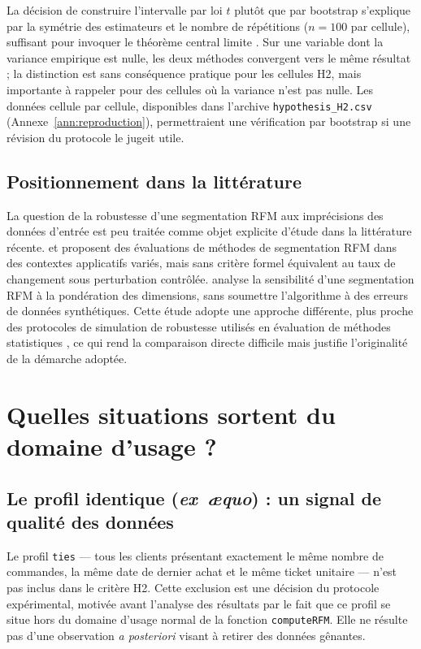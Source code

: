 La décision de construire l'intervalle par loi $t$ plutôt que par bootstrap s'explique par
la symétrie des estimateurs et le nombre de répétitions ($n = 100$ par cellule), suffisant
pour invoquer le théorème central limite \citep{Diez2019}. Sur une variable dont la variance
empirique est nulle, les deux méthodes convergent vers le même résultat ; la distinction est
sans conséquence pratique pour les cellules H2, mais importante à rappeler pour des cellules
où la variance n'est pas nulle. Les données cellule par cellule, disponibles dans l'archive
\texttt{hypothesis\_H2.csv} (Annexe~\ref{ann:reproduction}), permettraient une vérification
par bootstrap si une révision du protocole le jugeit utile.

\subsection{Positionnement dans la littérature}
\label{subsec:disc-h2-litterature}

La question de la robustesse d'une segmentation RFM aux imprécisions des données d'entrée est
peu traitée comme objet explicite d'étude dans la littérature récente. \citet{Rajendran2024}
et \citet{Sobantu2025} proposent des évaluations de méthodes de segmentation RFM dans des
contextes applicatifs variés, mais sans critère formel équivalent au taux de changement sous
perturbation contrôlée. \citet{Mingmongkhol2023} analyse la sensibilité d'une segmentation
RFM à la pondération des dimensions, sans soumettre l'algorithme à des erreurs de données
synthétiques. Cette étude adopte une approche différente, plus proche des protocoles de
simulation de robustesse utilisés en évaluation de méthodes statistiques \citep{Morris2019},
ce qui rend la comparaison directe difficile mais justifie l'originalité de la démarche
adoptée.

\section{Quelles situations sortent du domaine d'usage ?}
\label{sec:disc-hors-domaine}

\subsection{Le profil identique (\emph{ex~æquo}) : un signal de qualité des données}
\label{subsec:disc-ties}

Le profil \texttt{ties} — tous les clients présentant exactement le même nombre de commandes,
la même date de dernier achat et le même ticket unitaire — n'est pas inclus dans le critère
H2. Cette exclusion est une décision du protocole expérimental, motivée avant l'analyse des
résultats par le fait que ce profil se situe hors du domaine d'usage normal de la fonction
\texttt{computeRFM}. Elle ne résulte pas d'une observation \emph{a posteriori} visant à
retirer des données gênantes.

